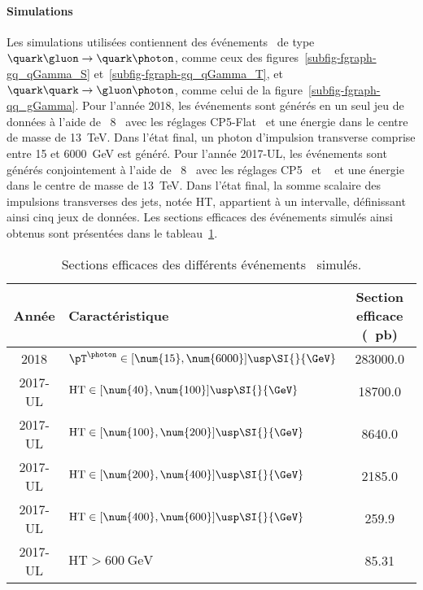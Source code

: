 \paragraph{Simulations}
Les simulations utilisées contiennent des événements \Gjets\ de type $\quark\gluon\to\quark\photon$, comme ceux des figures~\ref{subfig-fgraph-gq_qGamma_S} et~\ref{subfig-fgraph-gq_qGamma_T}, et $\quark\quark\to\gluon\photon$, comme celui de la figure~\ref{subfig-fgraph-qq_gGamma}.
Pour l'année 2018, les événements sont générés en un seul jeu de données
à l'aide de \PYTHIA~8~\cite{pythia8.2}
avec les réglages CP5-Flat~\cite{tunes_2019}
et une énergie dans le centre de masse de \SI{13}{\TeV}.
Dans l'état final, un photon d'impulsion transverse comprise entre \num{15} et \SI{6000}{\GeV} est généré.
Pour l'année 2017-UL, les événements sont générés conjointement
à l'aide de \PYTHIA~8~\cite{pythia8.2}
avec les réglages CP5~\cite{tunes_2019}
et
\MADGRAPHc~\cite{madgraph5}
et une énergie dans le centre de masse de \SI{13}{\TeV}.
Dans l'état final, la somme scalaire des impulsions transverses des jets, notée HT, appartient à un intervalle, définissant ainsi cinq jeux de données.
Les sections efficaces des événements simulés ainsi obtenus sont présentées dans le tableau~\ref{tab-MC_xsec_2018_and_2017UL_GJet}.
\begin{table}[h]
\centering
\begin{tabular}{clc}
\toprule
Année & Caractéristique & Section efficace (\SI{}{\pico\barn})\\
\midrule
2018 & $\pT^{\photon}\in [\num{15}, \num{6000}]\usp\SI{}{\GeV}$ & \num{283000.0}\\
2017-UL & $\text{HT} \in [\num{40}, \num{100}]\usp\SI{}{\GeV}$ & \num{18700.0} \\
2017-UL & $\text{HT} \in [\num{100}, \num{200}]\usp\SI{}{\GeV}$ & \num{8640.0} \\
2017-UL & $\text{HT} \in [\num{200}, \num{400}]\usp\SI{}{\GeV}$ & \num{2185.0} \\
2017-UL & $\text{HT} \in [\num{400}, \num{600}]\usp\SI{}{\GeV}$ & \num{259.9} \\
2017-UL & $\text{HT} > \SI{600}{\GeV}$ & \num{85.31} \\
\bottomrule
\end{tabular}
\caption{Sections efficaces des différents événements \Gjets\ simulés.}
\label{tab-MC_xsec_2018_and_2017UL_GJet}
\end{table}

